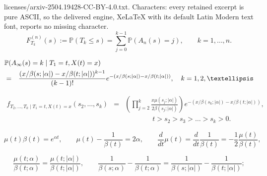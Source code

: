\documentclass[10pt,a4paper]{amsart}
\begin{document}
licenses/arxiv-2504.19428-CC-BY-4.0.txt. Characters: every retained excerpt is pure ASCII, so the delivered engine, XeLaTeX with its default Latin Modern text font, reports no missing character.
\begin{equation}	\label{TkFromAn}
F_{T_k}^{(n)}(s) := \mathbb{P}(T_k \le s) = \sum_{j = 0}^{k - 1} \mathbb{P}(A_n(s) = j), \qquad k = 1, \ldots, n.
\end{equation}

\begin{eqnarray}	\label{ancestorsGivenT1}
\lefteqn{\mathbb{P}(A_\infty(s) = k \mid T_1 = t, X(t) = x)} \nonumber \\
 	& = & \frac{(x/\beta(s; |\alpha|) - x/\beta(t; |\alpha|))^{k - 1}}{(k - 1)!} e^{-(x/\beta(s; |\alpha|) - x/\beta(t; |\alpha|))}, \quad k = 1, 2, \ldots
\end{eqnarray}

\begin{eqnarray}	\label{jointTkGivenx}
f_{T_2, \ldots, T_k \mid T_1 = t, X(t) = x}(s_2, \ldots, s_k) & = & \left(\prod_{j = 2}^k \frac{x \mu(s_j; |\alpha|)}{2\beta(s_j; |\alpha|)} \right) 
									e^{-(x/\beta(s_k; |\alpha|) - x/\beta(t; |\alpha|))}, \nonumber \\
	&  & \qquad\qquad t > s_2 > s_3 > \ldots > s_k > 0. 
\end{eqnarray}

\begin{equation}	\label{mubetaIdentity1}
\mu(t)\beta(t) = e^{\alpha t}, \qquad \mu(t) - \frac{1}{\beta(t)} = 2\alpha, \qquad \frac{d}{dt} \mu(t) = \frac{d}{dt} \frac{1}{\beta(t)} = -\frac{1}{2} \frac{\mu(t)}{\beta(t)},  
\end{equation}

\begin{equation}	\label{mubetaIdentity4}
\frac{\mu(t; \alpha)}{\beta(t; \alpha)} = \frac{\mu(t; |\alpha|)}{\beta(t; |\alpha|)}, \qquad 
	\frac{1}{\beta(s; \alpha)} - \frac{1}{\beta(t; \alpha)} = \frac{1}{\beta(s; |\alpha|)} - \frac{1}{\beta(t; |\alpha|)};  
\end{equation}
\end{document}

